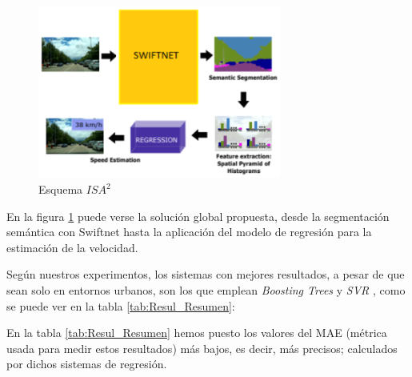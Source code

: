 \begin{figure}[H]
  \centering
  \includegraphics[width=8cm]{Figuras/Figura_Esquema_ISA2_Version_2.eps}
  \caption{Esquema $ISA^{2}$}
  \label{fig:isa2}
\end{figure}

En la figura \ref{fig:isa2} puede verse la solución global propuesta, desde la segmentación semántica con Swiftnet hasta la aplicación del modelo de regresión para la estimación de la velocidad.


Según nuestros experimentos, los sistemas con mejores resultados, a pesar de que sean solo en entornos urbanos, son los que emplean \textit{Boosting Trees} \cite{boosting-trees} y \textit{\ac{SVR}} \cite{SVR}, como se puede ver en la tabla \ref{tab:Resul_Resumen}:

\begin{table}[H]
\centering
{}
\caption{Resultados de Boosting Trees y \ac{SVR}}
\label{tab:Resul_Resumen}
\end{table}

En la tabla \ref{tab:Resul_Resumen} hemos puesto los valores del \ac{MAE} (métrica usada para medir estos resultados) más bajos, es decir, más precisos; calculados por dichos sistemas de regresión.

